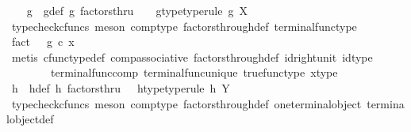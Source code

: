 \begin{isabellebody}
\ \ \isamarkupfalse%
\ g\ \ g{\isacharunderscore}{\kern0pt}def{\isacharcolon}{\kern0pt}\ {\isachardoublequoteopen}g\ factorsthru\ \ {\isasymt}{\isachardoublequoteclose}\ \ g{\isacharunderscore}{\kern0pt}type{\isacharbrackleft}{\kern0pt}type{\isacharunderscore}{\kern0pt}rule{\isacharbrackright}{\kern0pt}{\isacharcolon}{\kern0pt}\ {\isachardoublequoteopen}g{\isacharcolon}{\kern0pt}\ X\ {\isasymrightarrow}\ {\isasymOmega}{\isachardoublequoteclose}\isanewline
\ \ \ \ \isamarkupfalse%
\ {\isacharparenleft}{\kern0pt}typecheck{\isacharunderscore}{\kern0pt}cfuncs{\isacharcomma}{\kern0pt}\ meson\ comp{\isacharunderscore}{\kern0pt}type\ factors{\isacharunderscore}{\kern0pt}through{\isacharunderscore}{\kern0pt}def{}\ terminal{\isacharunderscore}{\kern0pt}func{\isacharunderscore}{\kern0pt}type{\isacharparenright}{\kern0pt}\isanewline
\ \ \isamarkupfalse%
\ \isamarkupfalse%
\ fact{}{\isacharcolon}{\kern0pt}\ {\isachardoublequoteopen}{\isasymt}\ {\isacharequal}{\kern0pt}\ g\ {\isasymcirc}\isactrlsub c\ x{\isachardoublequoteclose}\isanewline
\ \ \ \ \isamarkupfalse%
\ {\isacharparenleft}{\kern0pt}metis\ cfunc{\isacharunderscore}{\kern0pt}type{\isacharunderscore}{\kern0pt}def\ comp{\isacharunderscore}{\kern0pt}associative\ factors{\isacharunderscore}{\kern0pt}through{\isacharunderscore}{\kern0pt}def\ id{\isacharunderscore}{\kern0pt}right{\isacharunderscore}{\kern0pt}unit{}\ id{\isacharunderscore}{\kern0pt}type\isanewline
\ \ \ \ \ \ \ \ terminal{\isacharunderscore}{\kern0pt}func{\isacharunderscore}{\kern0pt}comp\ terminal{\isacharunderscore}{\kern0pt}func{\isacharunderscore}{\kern0pt}unique\ true{\isacharunderscore}{\kern0pt}func{\isacharunderscore}{\kern0pt}type\ x{\isacharunderscore}{\kern0pt}type{\isacharparenright}{\kern0pt}\isanewline
\ \ \ \ \ \isanewline
\ \ \isamarkupfalse%
\ h\ \ h{\isacharunderscore}{\kern0pt}def{\isacharcolon}{\kern0pt}\ {\isachardoublequoteopen}h\ factorsthru\ {\isasymf}{\isachardoublequoteclose}\ \ h{\isacharunderscore}{\kern0pt}type{\isacharbrackleft}{\kern0pt}type{\isacharunderscore}{\kern0pt}rule{\isacharbrackright}{\kern0pt}{\isacharcolon}{\kern0pt}\ {\isachardoublequoteopen}h{\isacharcolon}{\kern0pt}\ Y\ {\isasymrightarrow}\ {\isasymOmega}{\isachardoublequoteclose}\isanewline
\ \ \ \ \isamarkupfalse%
\ {\isacharparenleft}{\kern0pt}typecheck{\isacharunderscore}{\kern0pt}cfuncs{\isacharcomma}{\kern0pt}\ meson\ comp{\isacharunderscore}{\kern0pt}type\ factors{\isacharunderscore}{\kern0pt}through{\isacharunderscore}{\kern0pt}def{}\ one{\isacharunderscore}{\kern0pt}terminal{\isacharunderscore}{\kern0pt}object\ terminal{\isacharunderscore}{\kern0pt}object{\isacharunderscore}{\kern0pt}def{\isacharparenright}{\kern0pt}\isanewline

\end{isabellebody}
